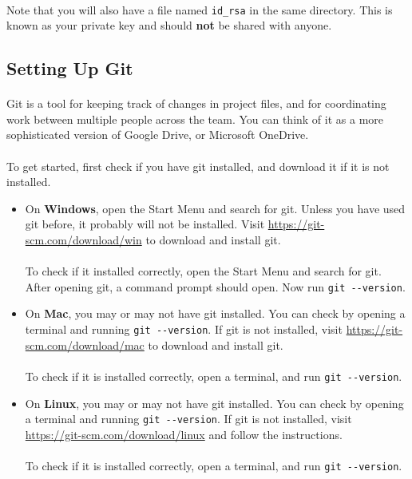 \documentclass[11pt]{article}
\begin{document}
\paragraph{}
Note that you will also have a file named \lstinline{id_rsa} in the same directory. This is known as your private key and should \textbf{not} be shared with anyone.
\subsection{Setting Up Git}
\paragraph{}
Git is a tool for keeping track of changes in project files, and for coordinating work between multiple people across the team. You can think of it as a more sophisticated version of Google Drive, or Microsoft OneDrive.
\paragraph{}
To get started, first check if you have git installed, and download it if it is not installed.
\begin{itemize}
\item On \textbf{Windows}, open the Start Menu and search for git. Unless you have used git before, it probably will not be installed. Visit \url{https://git-scm.com/download/win} to download and install git.\\\\
To check if it installed correctly, open the Start Menu and search for git. After opening git, a command prompt should open. Now run \lstinline{git --version}.
\item On \textbf{Mac}, you may or may not have git installed. You can check by opening a terminal and running \lstinline{git --version}. If git is not installed, visit \url{https://git-scm.com/download/mac} to download and install git.\\\\
To check if it is installed correctly, open a terminal, and run \lstinline{git --version}.
\item On \textbf{Linux}, you may or may not have git installed. You can check by opening a terminal and running \lstinline{git --version}. If git is not installed, visit \url{https://git-scm.com/download/linux} and follow the instructions.\\\\
To check if it is installed correctly, open a terminal, and run \lstinline{git --version}.
\end{itemize}
\end{document}
